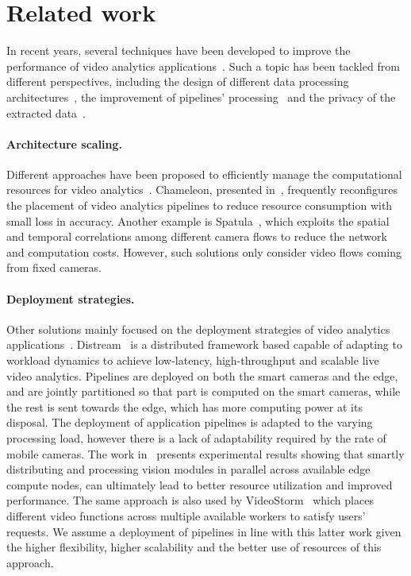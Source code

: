 \section{Related work}

In recent years, several techniques have been developed to improve the performance of video analytics applications~\cite{ibrahim2021survey,xu2023edge,hu2023edge}. Such a topic has been tackled from different perspectives, including the design of different data processing architectures~\cite{jain2020spatula,zhang2017live,jiang2018chameleon}, the improvement of pipelines' processing~\cite{fouladi2017encoding,chen2015glimpse,padmanabhan2021towards,padmanabhan2023gemel} and the privacy of the extracted data~\cite{cangialosi2022privid,poddar2020visor,wu2021pecam}. 

\paragraph{Architecture scaling.} Different approaches have been proposed to efficiently manage the computational resources for video analytics~\cite{jain2020spatula,zhang2017live,jiang2018chameleon,201465videostorm}. Chameleon, presented in~\cite{jiang2018chameleon}, frequently reconfigures the placement of video analytics pipelines to reduce resource consumption with small loss in accuracy. Another example is Spatula~\cite{jain2020spatula}, which exploits the spatial and temporal correlations among different camera flows to reduce the network and computation costs. However, such solutions only consider video flows coming from fixed cameras.


\paragraph{Deployment strategies.} 
Other solutions mainly focused on the deployment strategies of video analytics applications~\cite{zeng2020distream,201465videostorm,rachuri2021decentralized}. Distream~\cite{zeng2020distream} is a distributed framework based capable of adapting to workload dynamics to achieve low-latency, high-throughput and scalable live video analytics. Pipelines are deployed on both the smart cameras and the edge, and are jointly partitioned so that part is computed on the smart cameras, while the rest is sent towards the edge, which has more computing power at its disposal. The deployment of application pipelines is adapted to the varying processing load, however there is a lack of adaptability required by the rate of mobile cameras.
The work in~\cite{rachuri2021decentralized} presents experimental results showing that smartly distributing and processing vision modules in parallel across available edge compute nodes, can ultimately lead to better resource utilization and improved performance. The same approach is also used by VideoStorm~\cite{201465videostorm} which places different video functions across multiple available workers to satisfy users' requests. We assume a deployment of pipelines in line with this latter work given the higher flexibility, higher scalability and the better use of resources of this approach. 

